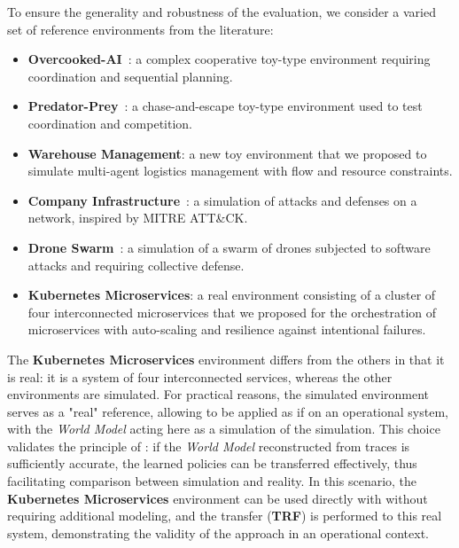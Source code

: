 To ensure the generality and robustness of the evaluation, we consider a varied set of reference environments from the  literature:
\begin{itemize}
\item \textbf{Overcooked-AI}~\cite{overcookedai}: a complex cooperative toy-type environment requiring coordination and sequential planning.
\item \textbf{Predator-Prey}~\cite{lowe2017multi}: a chase-and-escape toy-type environment used to test coordination and competition.
\item \textbf{Warehouse Management}: a new toy environment that we proposed to simulate multi-agent logistics management with flow and resource constraints.
\item \textbf{Company Infrastructure}~\cite{cyberbattlesim}: a simulation of attacks and defenses on a network, inspired by MITRE ATT\&CK.
\item \textbf{Drone Swarm}~\cite{cage_challenge_3_announcement}: a simulation of a swarm of drones subjected to software attacks and requiring collective defense.
\item \textbf{Kubernetes Microservices}: a real environment consisting of a cluster of four interconnected microservices that we proposed for the orchestration of microservices with auto-scaling and resilience against intentional failures.
\end {itemize}

The \textbf{Kubernetes Microservices} environment differs from the others in that it is real: it is a system of four interconnected services, whereas the other environments are simulated. For practical reasons, the simulated environment serves as a "real" reference, allowing  to be applied as if on an operational system, with the \textit {World Model} acting here as a simulation of the simulation. This choice validates the principle of : if the \textit{World Model} reconstructed from traces is sufficiently accurate, the learned policies can be transferred effectively, thus facilitating comparison between simulation and reality. In this scenario, the \textbf{Kubernetes Microservices} environment can be used directly with  without requiring additional modeling, and the transfer (\textbf{TRF}) is performed to this real system, demonstrating the validity of the approach in an operational context.

\medskip

